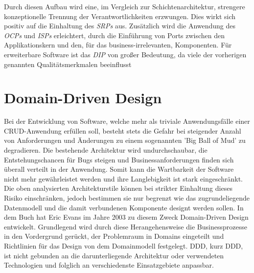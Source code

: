 
Durch diesen Aufbau wird eine, im Vergleich zur Schichtenarchitektur, strengere konzeptionelle Trennung der Verantwortlichkeiten erzwungen. Dies wirkt sich positiv auf die Einhaltung des \emph{\acrlong{SRP}s} aus. Zusätzlich wird die Anwendung des \emph{\acrlong{OCP}s} und \emph{\acrlong{ISP}s} erleichtert, durch die Einführung von Ports zwischen den Applikationskern und den, für das business-irrelevanten, Komponenten. Für erweiterbare Software ist das \emph{\acrlong{DIP}} von großer Bedeutung, da viele der vorherigen genannten Qualitätsmerkmalen beeinflusst 





\section{Domain-Driven Design}

Bei der Entwicklung von Software, welche mehr als triviale Anwendungsfälle einer CRUD-Anwendung erfüllen soll, besteht stets die Gefahr bei steigender Anzahl von Anforderungen und Änderungen zu einem sogenannten 'Big Ball of Mud' zu {\color{red} degradieren}. Die bestehende Architektur wird undurchschaubar, die Entstehungschancen für Bugs steigen und Businessanforderungen finden sich überall verteilt in der Anwendung. Somit kann die Wartbarkeit der Software nicht mehr gewährleistet werden und ihre Langlebigkeit ist stark eingeschränkt. Die oben analysierten Architekturstile können bei strikter Einhaltung dieses Risiko einschränken, jedoch bestimmen sie nur begrenzt wie das zugrundeliegende Datenmodell und die damit verbundenen Komponente designt werden sollen. In dem Buch  hat Eric Evans im Jahre 2003 zu diesem Zweck Domain-Driven Design entwickelt. Grundlegend wird durch diese Herangehensweise die Businessprozesse in den Vordergrund gerückt, der Problemraum in Domains eingeteilt und Richtlinien für das Design von dem Domainmodell festgelegt. \acrlong{DDD}, kurz \acrshort{DDD}, ist nicht gebunden an die darunterliegende Architektur oder verwendeten Technologien und folglich an verschiedenste Einsatzgebiete anpassbar.

